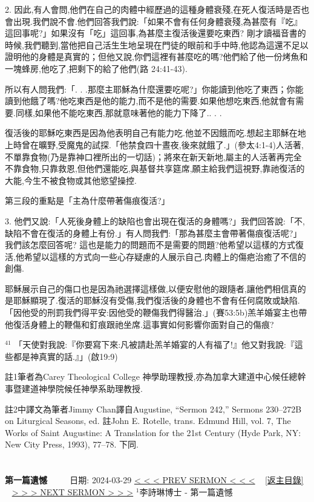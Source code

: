 \documentclass{book}
\begin{document}
2. 因此,有人會問,他們在自己的肉體中經歷過的這種身體衰殘,在死人復活時是否也會出現.我們說不會.他們回答我們說:「如果不會有任何身體衰殘,為甚麼有『吃』這回事呢?」如果沒有「吃」這回事,為甚麼主復活後還要吃東西? 剛才讀福音書的時候,我們聽到,當他把自己活生生地呈現在門徒的眼前和手中時,他認為這還不足以證明他的身體是真實的；但他又說,你們這裡有甚麼吃的嗎?他們給了他一份烤魚和一塊蜂房,他吃了,把剩下的給了他們(路 24:41-43).

所以有人問我們:「. . .那麼主耶穌為什麼還要吃呢?」你能讀到他吃了東西；你能讀到他餓了嗎?他吃東西是他的能力,而不是他的需要.如果他想吃東西,他就會有需要.同樣,如果他不能吃東西,那就意味著他的能力下降了.. . .

復活後的耶穌吃東西是因為他表明自己有能力吃.他並不因餓而吃.想起主耶穌在地上時曾在曠野,受魔鬼的試探.「他禁食四十晝夜,後來就餓了.」(參太4:1-4)人活著,不單靠食物(乃是靠神口裡所出的一切話)；將來在新天新地,屬主的人活著再完全不靠食物,只靠救恩,但他們還能吃,與基督共享筵席,願主給我們這視野,靠祂復活的大能,今生不被食物或其他慾望操控.

第三段的重點是「主為什麼帶著傷痕復活?」

3. 他們又說:「人死後身體上的缺陷也會出現在復活的身體嗎?」我們回答說:「不,缺陷不會在復活的身體上有份.」有人問我們:「那為甚麼主會帶著傷痕復活呢?」 我們該怎麼回答呢? 這也是能力的問題而不是需要的問題?他希望以這樣的方式復活,他希望以這樣的方式向一些心存疑慮的人展示自己.肉體上的傷疤治癒了不信的創傷.

耶穌展示自己的傷口也是因為祂選擇這樣做,以便安慰他的跟隨者,讓他們相信真的是耶穌顯現了.復活的耶穌沒有受傷,我們復活後的身體也不會有任何腐敗或缺陷.「因他受的刑罰我們得平安:因他受的鞭傷我們得醫治.」(賽53:5b)羔羊婚宴主也帶他復活身體上的鞭傷和釘痕跟祂坐席.這事實如何影響你面對自己的傷痕?

$^{41}$
「天使對我說:『你要寫下來:凡被請赴羔羊婚宴的人有福了!』他又對我說:『這些都是神真實的話.』」(啟19:9)

註1筆者為Carey Theological College 神學助理教授,亦為加拿大建道中心候任總幹事暨建道神學院候任神學系助理教授.

註2中譯文為筆者Jimmy Chan譯自Augustine, “Sermon 242,” Sermons 230–272B on Liturgical Seasons, ed. 註John E. Rotelle, trans. Edmund Hill, vol. 7, The Works of Saint Augustine: A Translation for the 21st Century (Hyde Park, NY: New City Press, 1993), 77–78. 下同.
\newpage



\section{}
\label{sec:11}
\textbf{第一篇遺憾}
\newline
\newline
~~~~ 日期: 2024-03-29
\newline
\newline
\hyperref[sec:10]{\small{< < < PREV SERMON < < <}}
~
\hyperref[sec:index]{\small{[返主目錄]}}
~
\hyperref[sec:12]{\small{> > > NEXT SERMON > > >}}
\newline
\newline
$^{1}$李詩琳博士 - 第一篇遺憾
\end{document}

